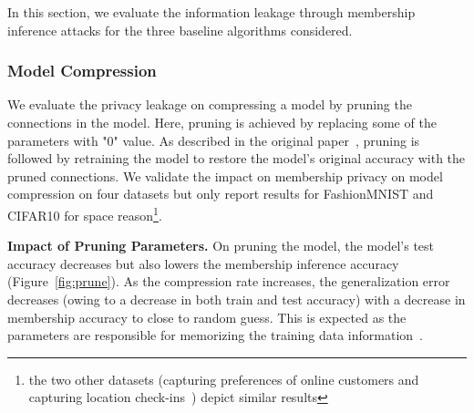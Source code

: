 In this section, we evaluate the information leakage through membership inference attacks for the three baseline algorithms considered.

\subsubsection{Model Compression}

We evaluate the privacy leakage on compressing a model by pruning the connections in the model.
Here, pruning is achieved by replacing some of the parameters with "0" value.
As described in the original paper~\cite{Han:2015:LBW:2969239.2969366,DBLP:journals/corr/HanPNMTECTD16}, pruning is followed by retraining the model to restore the model's original accuracy with the pruned connections.
We validate the impact on membership privacy on model compression on four datasets but only report results for FashionMNIST and CIFAR10 
for space reason\footnote{the two other datasets (capturing preferences of online customers and capturing location check-ins~\cite{shokri2017membership}) depict similar results}.%

\textbf{Impact of Pruning Parameters.} On pruning the model, the model's test accuracy decreases but also lowers the membership inference accuracy (Figure~\ref{fig:prune}). %
As the compression rate increases, the generalization error decreases (owing to a decrease in both train and test accuracy) with a decrease in membership accuracy to close to random guess.
This is expected as the parameters are responsible for memorizing the training data information~\cite{DBLP:journals/corr/abs-1812-00910,236216,10.1145/3133956.3134077}. %




%


